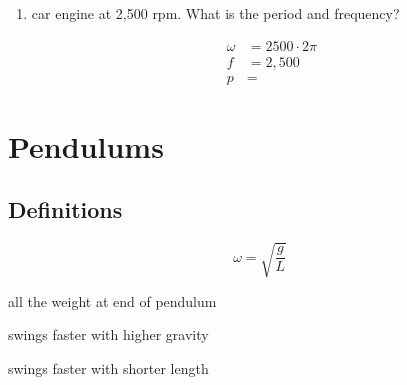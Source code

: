\documentclass{exam}
\begin{document}
\begin{enumerate}
    \item car engine at 2,500 rpm.  What is the period and frequency?
      \begin{solution}
        \begin{align*}
          \omega &= 2500 \cdot 2 \pi \\
          f &= 2,500 \\
          p &= 
        \end{align*}
      \end{solution}
  \end{enumerate}

  \section{Pendulums}

  \subsection{Definitions}
  \[
    \omega = \sqrt{\frac{g}{L}}
  \]

  \begin{itemize*}
    \item all the weight at end of pendulum
    \item swings faster with higher gravity
    \item swings faster with shorter length
  \end{itemize*}
\end{document}
